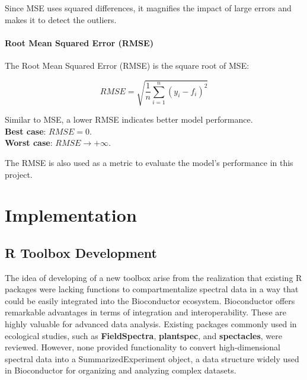 \documentclass[12pt,a4paper]{report}
\begin{document}
Since MSE uses squared differences, it magnifies the impact of large errors and makes it to detect the outliers.

\subsubsection*{Root Mean Squared Error (RMSE)}
The Root Mean Squared Error (RMSE) is the square root of MSE:

\begin{equation}
    RMSE = \sqrt{\frac{1}{n} \sum_{i=1}^{n} (y_i - f_i)^2}
\end{equation}

Similar to MSE, a lower RMSE indicates better model performance. \\

\textbf{Best case}: $RMSE = 0$. \\
\textbf{Worst case}: $RMSE \to +\infty$. 

The RMSE is also used as a metric to evaluate the model's performance in this project.




\chapter{Implementation}
\section{R Toolbox Development}
The idea of developing of a new toolbox arise from the realization that existing R packages were lacking functions to compartmentalize spectral data in a way that could be easily integrated into the Bioconductor ecosystem. Bioconductor offers remarkable advantages in terms of integration and interoperability. These are highly valuable for advanced data analysis. 
Existing packages commonly used in ecological studies, such as \textbf{FieldSpectra}, \textbf{plantspec}, and \textbf{spectacles}, were reviewed. However, none provided functionality to convert high-dimensional spectral data into a SummarizedExperiment object, a data structure widely used in Bioconductor for organizing and analyzing complex datasets. \\
\end{document}
